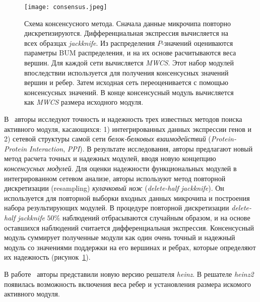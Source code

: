 \begin{figure}
    \centering
    \texttt{[image: consensus.jpeg]}
    \caption{
        Схема консенсусного метода.  Сначала данные микрочипа повторно
        дискретизируются.  Дифференциальная экспрессия вычисляется на всех
        образцах \emph{jackknife}.  Из распределения $P$-значений оцениваются
        параметры BUM распределения, и на их основе расчитываются веса вершин.
        Для каждой сети вычисляется \emph{MWCS}. Этот набор модулей впоследствии
        используется для получения консенсусных значений вершин и ребер.  Затем
        исходная сеть переоценивается с помощью консенсусных значений.  В конце
        консенсусный модуль вычисляется как \emph{MWCS} размера исходного модуля.
    }
    \label{consensus}
\end{figure}

В~\cite{Beisser2012} авторы исследуют точность и надежность трех известных
методов поиска активного модуля, касающихся:
1) интегрированных данных экспрессии генов и
2) сетевой структуры самой сети \emph{белок-белковых взаимодействий}
   (\emph{Protein-Protein Interaction}, \emph{PPI}).  В результате
   исследования, авторы предлагают новый метод расчета точных и надежных
   модулей, вводя новую концепцию \emph{консенсусных модулей}.  Для оценки
   надежности функциональных модулей в интегрированном сетевом анализе, авторы
   используют метод повторной дискретизации (resampling) \emph{кулачковый нож}
   (\emph{delete-half jackknife}). Он используется для повторной выборки
   входных данных микрочипа и построения набора результирующих модулей.
   В процедуре повторной дискретизации \emph{delete-half jackknife} $50\%$ наблюдений
   отбрасываются случайным образом, и на основе оставшихся наблюдений считается
   дифференциальная экспрессия.  Консенсусный модуль суммирует полученные
   модули как один очень точный и надежный модуль со значениями поддержки на
   его вершинах и ребрах, которые определяют их надежность
   (рисунок~\ref{consensus}).

В работе~\cite{Beisser2012} авторы представили новую версию решателя
\emph{heinz}.  В решателе \emph{heinz2} появилась возможность включения веса
ребер и установления размера искомого активного модуля.


